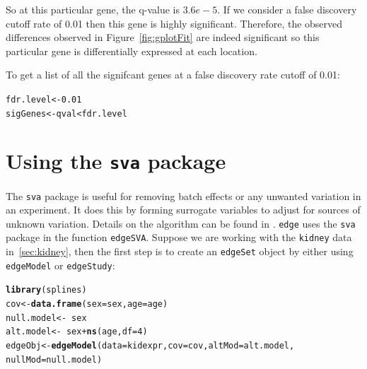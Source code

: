 \documentclass{article}\usepackage[]{graphicx}\usepackage[]{color}
\makeatletter
\newcommand{\hlnum}[1]{\textcolor[rgb]{0.686,0.059,0.569}{#1}}%
\newcommand{\hlopt}[1]{\textcolor[rgb]{0,0,0}{#1}}%
\newcommand{\hlstd}[1]{\textcolor[rgb]{0.345,0.345,0.345}{#1}}%
\newcommand{\hlkwb}[1]{\textcolor[rgb]{0.69,0.353,0.396}{#1}}%
\newcommand{\hlkwc}[1]{\textcolor[rgb]{0.333,0.667,0.333}{#1}}%
\newcommand{\hlkwd}[1]{\textcolor[rgb]{0.737,0.353,0.396}{\textbf{#1}}}%
\newenvironment{kframe}{%
 \def\at@end@of@kframe{}%
 \ifinner\ifhmode%
  \def\at@end@of@kframe{\end{minipage}}%
  \begin{minipage}{\columnwidth}%
 \fi\fi%
 \def\FrameCommand##1{\hskip\@totalleftmargin \hskip-\fboxsep
 \colorbox{shadecolor}{##1}\hskip-\fboxsep
     \hskip-\linewidth \hskip-\@totalleftmargin \hskip\columnwidth}%
 \MakeFramed {\advance\hsize-\width
   \@totalleftmargin\z@ \linewidth\hsize
   \@setminipage}}%
 {\par\unskip\endMakeFramed%
 \at@end@of@kframe}
\newenvironment{knitrout}{}{} %
\makeatother
\begin{document}
So at this particular gene, the q-value is $3.6e-5$. If we consider a false discovery cutoff rate of 0.01 then this gene is highly significant. Therefore, the observed differences observed in Figure~\ref{fig:gplotFit} are indeed significant so this particular gene is differentially expressed at each location. 

To get a list of all the signifcant genes at a false discovery rate cutoff of 0.01:
\begin{knitrout}
\color{fgcolor}\begin{kframe}
\begin{alltt}
\hlstd{fdr.level} \hlkwb{<-} \hlnum{0.01}
\hlstd{sigGenes} \hlkwb{<-} \hlstd{qval} \hlopt{<} \hlstd{fdr.level}
\end{alltt}
\end{kframe}
\end{knitrout}

\section{Using the {\tt sva} package}
\label{sec:SVA}
The {\tt sva} package is useful for removing batch effects or any unwanted variation in an experiment. It does this by forming surrogate variables to adjust for sources of unknown variation. Details on the algorithm can be found in \cite{leek:2007}. {\tt edge} uses the {\tt sva} package in the function {\tt edgeSVA}. Suppose we are working with the {\tt kidney} data in~\ref{sec:kidney}, then the first step is to create an {\tt edgeSet} object by either using {\tt edgeModel} or {\tt edgeStudy}:
\begin{knitrout}
\color{fgcolor}\begin{kframe}
\begin{alltt}
\hlkwd{library}\hlstd{(splines)}
\hlstd{cov} \hlkwb{<-} \hlkwd{data.frame}\hlstd{(}\hlkwc{sex} \hlstd{= sex,} \hlkwc{age} \hlstd{= age)}
\hlstd{null.model} \hlkwb{<-} \hlopt{~}\hlstd{sex}
\hlstd{alt.model} \hlkwb{<-} \hlopt{~}\hlstd{sex} \hlopt{+} \hlkwd{ns}\hlstd{(age,} \hlkwc{df} \hlstd{=} \hlnum{4}\hlstd{)}
\hlstd{edgeObj} \hlkwb{<-} \hlkwd{edgeModel}\hlstd{(}\hlkwc{data} \hlstd{= kidexpr,} \hlkwc{cov} \hlstd{= cov,} \hlkwc{altMod} \hlstd{= alt.model,}
    \hlkwc{nullMod} \hlstd{= null.model)}
\end{alltt}
\end{kframe}
\end{knitrout}
\end{document}
